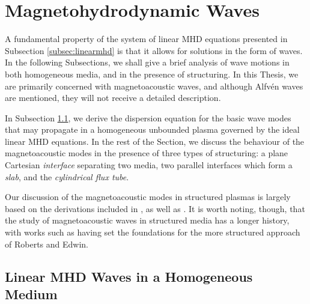 \section{Magnetohydrodynamic Waves}
\label{sec:mhdwaves}

A fundamental property of the system of linear MHD equations presented in Subsection \ref{subsec:linearmhd} is that it allows for solutions in the form of waves.
In the following Subsections, we shall give a brief analysis of wave motions in both homogeneous media, and in the presence of structuring.
In this Thesis, we are primarily concerned with magnetoacoustic waves, and although Alfv\'en waves are mentioned, they will not receive a detailed description.

In Subsection \ref{subsec:linearmhdwaves}, we derive the dispersion equation for the basic wave modes that may propagate in a homogeneous unbounded plasma governed by the ideal linear MHD equations.
In the rest of the Section, we discuss the behaviour of the magnetoacoustic modes in the presence of three types of structuring: a plane Cartesian \emph{interface} separating two media, two parallel interfaces which form a \emph{slab}, and the \emph{cylindrical flux tube}.

Our discussion of the magnetoacoustic modes in structured plasmas is largely based on the derivations included in \cite{Roberts1981, Roberts1981b, Edwin1982}, as well as \cite{Goedbloed2004, Priest2014}.
It is worth noting, though, that the study of magnetoacoustic waves in structured media has a longer history, with works such as \cite{Cram1975, Defouw1976, Roberts1978, Wilson1978, Roberts1979, Wentzel1979, Wilson1979, Spruit1981} having set the foundations for the more structured approach of Roberts and Edwin.

\subsection{Linear MHD Waves in a Homogeneous Medium}
\label{subsec:linearmhdwaves}

